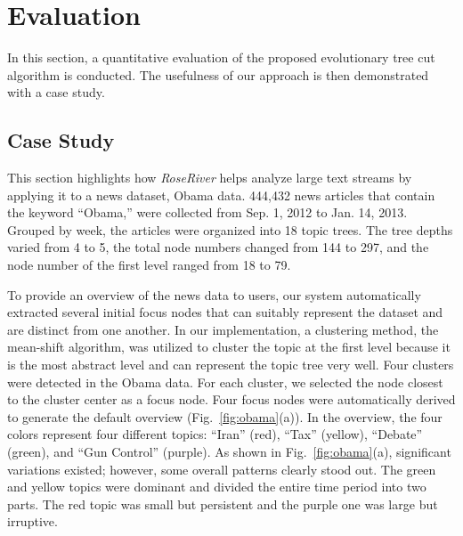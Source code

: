 \section{Evaluation}\label{sec:evaluation}

In this section, a quantitative evaluation of the proposed evolutionary tree cut algorithm is conducted.
The usefulness of our approach is then demonstrated with a case study.





\subsection{Case Study}
This section highlights how \emph{RoseRiver} helps analyze large text streams by applying it to a news dataset, Obama data.
444,432 news articles that contain the keyword ``Obama,'' were collected from Sep. 1, 2012 to Jan. 14, 2013.
Grouped by week, the articles were organized into 18 topic trees. %
The tree depths varied from 4 to 5, the total node numbers changed from 144 to 297, and the node
number of the first level ranged from 18 to 79.


To provide an overview of the news data to users, our system automatically extracted several initial focus nodes that can suitably represent the dataset and are distinct from one another.
In our implementation, a clustering method, the mean-shift algorithm, was utilized to cluster the topic at the first level because it is the most abstract level and can represent the topic tree very well.
Four clusters were detected in the Obama data.
For each cluster, we selected the node closest to the cluster center as a focus node.
Four focus nodes were automatically derived to generate the default overview (Fig.~\ref{fig:obama}(a)).
In the overview, the four colors represent four different topics: ``Iran'' (red), ``Tax'' (yellow), ``Debate'' (green), and ``Gun Control'' (purple).
As shown in Fig.~\ref{fig:obama}(a), significant variations existed; however, some overall patterns clearly stood out.
The green and yellow topics were dominant and divided the entire time period into two parts.
The red topic was small but persistent and the purple one was large but irruptive.

